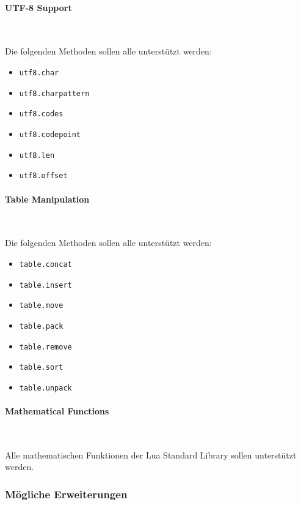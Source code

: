 \documentclass{article}
\let\oldparagraph\paragraph
\renewcommand{\paragraph}[1]{\oldparagraph{#1}\mbox{}\\}
\begin{document}
\paragraph{UTF-8 Support}\hypertarget{utf-8-support}{}\label{utf-8-support}

Die folgenden Methoden sollen alle unterstützt werden:

\begin{multicols}{2}
\begin{itemize}
\item \texttt{utf8.char}
\item \texttt{utf8.charpattern}
\item \texttt{utf8.codes}
\item \texttt{utf8.codepoint}
\item \texttt{utf8.len}
\item \texttt{utf8.offset}
\end{itemize}
\end{multicols}

\paragraph{Table Manipulation}\hypertarget{table-manipulation}{}\label{table-manipulation}

Die folgenden Methoden sollen alle unterstützt werden:

\begin{multicols}{2}
\begin{itemize}
\item \texttt{table.concat}
\item \texttt{table.insert}
\item \texttt{table.move}
\item \texttt{table.pack}
\item \texttt{table.remove}
\item \texttt{table.sort}
\item \texttt{table.unpack}
\end{itemize}
\end{multicols}

\paragraph{Mathematical Functions}\hypertarget{mathematical-functions}{}\label{mathematical-functions}

Alle mathematischen Funktionen der Lua Standard Library sollen unterstützt werden.

\subsubsection*{Mögliche Erweiterungen}\hypertarget{mögliche-erweiterungen}{}\label{mögliche-erweiterungen}
\end{document}
